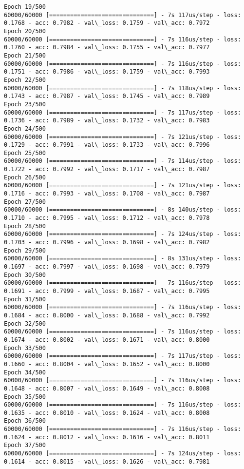 \documentclass[11pt]{article}
\begin{document}
\begin{Verbatim}[commandchars=\\\{\}]
Epoch 19/500
60000/60000 [==============================] - 7s 117us/step - loss: 0.1768 - acc: 0.7982 - val\_loss: 0.1759 - val\_acc: 0.7972
Epoch 20/500
60000/60000 [==============================] - 7s 116us/step - loss: 0.1760 - acc: 0.7984 - val\_loss: 0.1755 - val\_acc: 0.7977
Epoch 21/500
60000/60000 [==============================] - 7s 116us/step - loss: 0.1751 - acc: 0.7986 - val\_loss: 0.1759 - val\_acc: 0.7993
Epoch 22/500
60000/60000 [==============================] - 7s 118us/step - loss: 0.1743 - acc: 0.7987 - val\_loss: 0.1745 - val\_acc: 0.7989
Epoch 23/500
60000/60000 [==============================] - 7s 117us/step - loss: 0.1736 - acc: 0.7989 - val\_loss: 0.1732 - val\_acc: 0.7983
Epoch 24/500
60000/60000 [==============================] - 7s 121us/step - loss: 0.1729 - acc: 0.7991 - val\_loss: 0.1733 - val\_acc: 0.7996
Epoch 25/500
60000/60000 [==============================] - 7s 114us/step - loss: 0.1722 - acc: 0.7992 - val\_loss: 0.1717 - val\_acc: 0.7987
Epoch 26/500
60000/60000 [==============================] - 7s 121us/step - loss: 0.1716 - acc: 0.7993 - val\_loss: 0.1708 - val\_acc: 0.7987
Epoch 27/500
60000/60000 [==============================] - 8s 140us/step - loss: 0.1710 - acc: 0.7995 - val\_loss: 0.1712 - val\_acc: 0.7978
Epoch 28/500
60000/60000 [==============================] - 7s 124us/step - loss: 0.1703 - acc: 0.7996 - val\_loss: 0.1698 - val\_acc: 0.7982
Epoch 29/500
60000/60000 [==============================] - 8s 131us/step - loss: 0.1697 - acc: 0.7997 - val\_loss: 0.1698 - val\_acc: 0.7979
Epoch 30/500
60000/60000 [==============================] - 7s 116us/step - loss: 0.1691 - acc: 0.7999 - val\_loss: 0.1687 - val\_acc: 0.7995
Epoch 31/500
60000/60000 [==============================] - 7s 116us/step - loss: 0.1684 - acc: 0.8000 - val\_loss: 0.1688 - val\_acc: 0.7992
Epoch 32/500
60000/60000 [==============================] - 7s 116us/step - loss: 0.1674 - acc: 0.8002 - val\_loss: 0.1671 - val\_acc: 0.8000
Epoch 33/500
60000/60000 [==============================] - 7s 117us/step - loss: 0.1660 - acc: 0.8004 - val\_loss: 0.1652 - val\_acc: 0.8000
Epoch 34/500
60000/60000 [==============================] - 7s 116us/step - loss: 0.1648 - acc: 0.8007 - val\_loss: 0.1649 - val\_acc: 0.8008
Epoch 35/500
60000/60000 [==============================] - 7s 116us/step - loss: 0.1635 - acc: 0.8010 - val\_loss: 0.1624 - val\_acc: 0.8008
Epoch 36/500
60000/60000 [==============================] - 7s 116us/step - loss: 0.1624 - acc: 0.8012 - val\_loss: 0.1616 - val\_acc: 0.8011
Epoch 37/500
60000/60000 [==============================] - 7s 124us/step - loss: 0.1614 - acc: 0.8015 - val\_loss: 0.1626 - val\_acc: 0.7981

\end{Verbatim}
\end{document}
